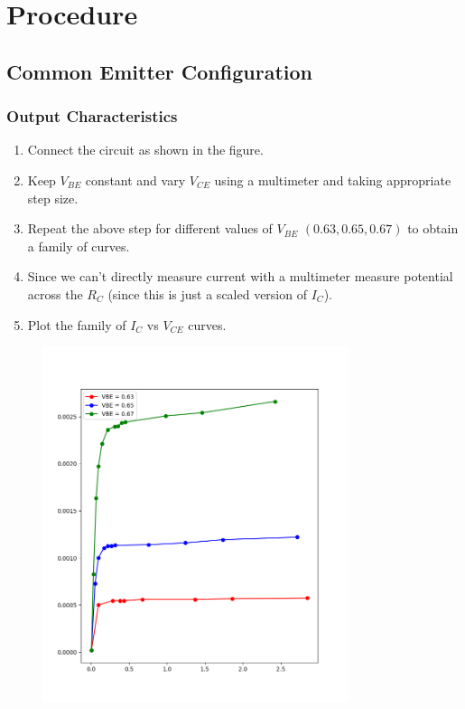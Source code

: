 \documentclass[12pt,a4paper]{article}
\begin{document}
\section{Procedure}

\subsection{Common Emitter Configuration}
\subsubsection{Output Characteristics}
\begin{enumerate}
    \item Connect the circuit as shown in the figure. 
    \item Keep $V_{BE}$ constant and vary $V_{CE}$ using a multimeter and taking appropriate step size.
    \item Repeat the above step for different values of $V_{BE}$ $(0.63, 0.65, 0.67)$ to obtain a family of curves.
    \item Since we can't directly measure current with a multimeter measure potential across the $R_C$ (since this is just a scaled version of $I_C$).
    \item Plot the family of $I_C$ vs $V_{CE}$ curves.
\end{enumerate}
\begin{figure}[H]
    \centering
    \includegraphics[width=0.8\textwidth]{Experiment_6/figs/ce_op.png}
\end{figure}
\end{document}
